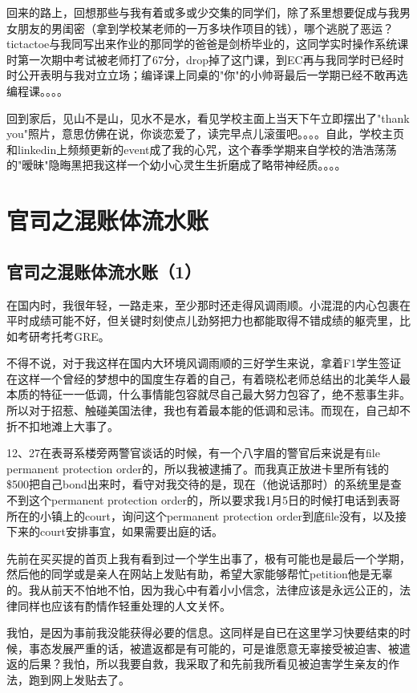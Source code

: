 \documentclass[12pt]{book}
\begin{document}
回来的路上，回想那些与我有着或多或少交集的同学们，除了系里想要促成与我男女朋友的男闺密（拿到学校某老师的一万多块作项目的钱），哪个逃脱了恶运？tictactoe与我同写出来作业的那同学的爸爸是剑桥毕业的，这同学实时操作系统课时第一次期中考试被老师打了67分，drop掉了这门课，到EC再与我同学时已经时时公开表明与我对立立场；编译课上同桌的"你"的小帅哥最后一学期已经不敢再选编程课。。。。

回到家后，见山不是山，见水不是水，看见学校主面上当天下午立即摆出了"thank you"照片，意思仿佛在说，你谈恋爱了，读完早点儿滚蛋吧。。。。自此，学校主页和linkedin上频频更新的event成了我的心咒，这个春季学期来自学校的浩浩荡荡的"暧昧"隐晦黑把我这样一个幼小心灵生生折磨成了略带神经质。。。。

\chapter{官司之混账体流水账}
\label{sec-40}
\section{官司之混账体流水账（1）}
\label{sec-40-1}
在国内时，我很年轻，一路走来，至少那时还走得风调雨顺。小混混的内心包裹在平时成绩可能不好，但关键时刻使点儿劲努把力也都能取得不错成绩的躯壳里，比如考研考托考GRE。

不得不说，对于我这样在国内大环境风调雨顺的三好学生来说，拿着F1学生签证在这样一个曾经的梦想中的国度生存着的自己，有着晓松老师总结出的北美华人最本质的特征一一低调，什么事情能包容就尽自己最大努力包容了，绝不惹事生非。所以对于招惹、触碰美国法律，我也有着最本能的低调和忌讳。而现在，自己却不折不扣地滩上大事了。

12、27在表哥系楼旁两警官谈话的时候，有一个八字眉的警官后来说是有file permanent protection order的，所以我被逮捕了。而我真正放进卡里所有钱的\$500把自己bond出来时，看守对我交待的是，现在（他说话那时）的系统里是查不到这个permanent protection order的，所以要求我1月5日的时候打电话到表哥所在的小镇上的court，询问这个permanent protection order到底file没有，以及接下来的court安排事宜，如果需要出庭的话。

先前在买买提的首页上我有看到过一个学生出事了，极有可能也是最后一个学期，然后他的同学或是亲人在网站上发贴有助，希望大家能够帮忙petition他是无辜的。我从前天不怕地不怕，因为我心中有着小小信念，法律应该是永远公正的，法律同样也应该有酌情作轻重处理的人文关怀。

我怕，是因为事前我没能获得必要的信息。这同样是自已在这里学习快要结束的时候，事态发展严重的话，被遣返都是有可能的，可是谁愿意无辜接受被迫害、被遣返的后果？我怕，所以我要自救，我采取了和先前我所看见被迫害学生亲友的作法，跑到网上发贴去了。
\end{document}
